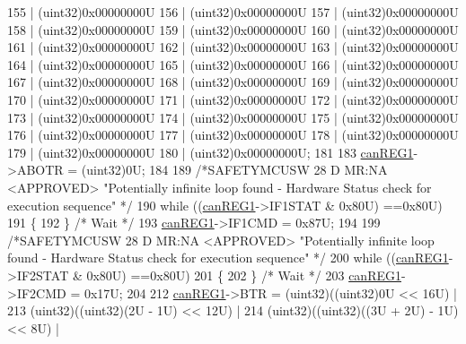 \begin{DoxyCode}
155                          | (uint32)0x00000000U
156                          | (uint32)0x00000000U
157                          | (uint32)0x00000000U
158                          | (uint32)0x00000000U
159                          | (uint32)0x00000000U
160                          | (uint32)0x00000000U
161                          | (uint32)0x00000000U
162                          | (uint32)0x00000000U
163                          | (uint32)0x00000000U
164                          | (uint32)0x00000000U
165                          | (uint32)0x00000000U
166                          | (uint32)0x00000000U
167                          | (uint32)0x00000000U
168                          | (uint32)0x00000000U
169                          | (uint32)0x00000000U
170                          | (uint32)0x00000000U
171                          | (uint32)0x00000000U
172                          | (uint32)0x00000000U
173                          | (uint32)0x00000000U
174                          | (uint32)0x00000000U
175                          | (uint32)0x00000000U
176                          | (uint32)0x00000000U
177                          | (uint32)0x00000000U
178                          | (uint32)0x00000000U
179                          | (uint32)0x00000000U
180                          | (uint32)0x00000000U;
181 
183     \mbox{\hyperlink{reg__can_8h_a7a0d043070590fc91cfa3c0e39379b19}{canREG1}}->ABOTR = (uint32)0U;
184 
189     \textcolor{comment}{/*SAFETYMCUSW 28 D MR:NA <APPROVED> "Potentially infinite loop found - Hardware Status check for
       execution sequence" */}
190     \textcolor{keywordflow}{while} ((\mbox{\hyperlink{reg__can_8h_a7a0d043070590fc91cfa3c0e39379b19}{canREG1}}->IF1STAT & 0x80U) ==0x80U)
191     \{ 
192     \} \textcolor{comment}{/* Wait */}
193     \mbox{\hyperlink{reg__can_8h_a7a0d043070590fc91cfa3c0e39379b19}{canREG1}}->IF1CMD  = 0x87U;
194 
199     \textcolor{comment}{/*SAFETYMCUSW 28 D MR:NA <APPROVED> "Potentially infinite loop found - Hardware Status check for
       execution sequence" */}
200     \textcolor{keywordflow}{while} ((\mbox{\hyperlink{reg__can_8h_a7a0d043070590fc91cfa3c0e39379b19}{canREG1}}->IF2STAT & 0x80U) ==0x80U)
201     \{ 
202     \} \textcolor{comment}{/* Wait */}
203     \mbox{\hyperlink{reg__can_8h_a7a0d043070590fc91cfa3c0e39379b19}{canREG1}}->IF2CMD = 0x17U;
204 
212     \mbox{\hyperlink{reg__can_8h_a7a0d043070590fc91cfa3c0e39379b19}{canREG1}}->BTR = (uint32)((uint32)0U << 16U) |
213                    (uint32)((uint32)(2U - 1U) << 12U) |
214                    (uint32)((uint32)((3U + 2U) - 1U) << 8U) |

\end{DoxyCode}
